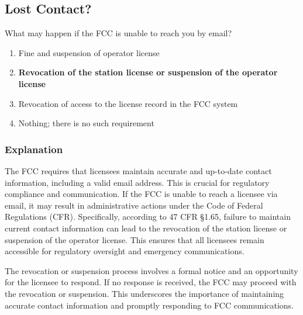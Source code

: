 \subsection{Lost Contact?}
\label{T1C04}

\begin{tcolorbox}[colback=gray!10!white,colframe=black!75!black,title=T1C04]
What may happen if the FCC is unable to reach you by email?
\begin{enumerate}[label=\Alph*)]
    \item Fine and suspension of operator license
    \item \textbf{Revocation of the station license or suspension of the operator license}
    \item Revocation of access to the license record in the FCC system
    \item Nothing; there is no such requirement
\end{enumerate}
\end{tcolorbox}

\subsubsection{Explanation}
The FCC requires that licensees maintain accurate and up-to-date contact information, including a valid email address. This is crucial for regulatory compliance and communication. If the FCC is unable to reach a licensee via email, it may result in administrative actions under the Code of Federal Regulations (CFR). Specifically, according to 47 CFR §1.65, failure to maintain current contact information can lead to the revocation of the station license or suspension of the operator license. This ensures that all licensees remain accessible for regulatory oversight and emergency communications.

The revocation or suspension process involves a formal notice and an opportunity for the licensee to respond. If no response is received, the FCC may proceed with the revocation or suspension. This underscores the importance of maintaining accurate contact information and promptly responding to FCC communications.

